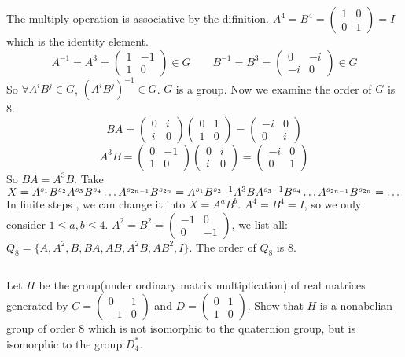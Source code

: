 \begin{answer}
    The multiply operation is associative by the difinition. $A^{4}=B^{4}=\begin{pmatrix}
        1&0\\0&1
    \end{pmatrix}=I$ which is the identity element.\[A^{-1}=A^{3}=\begin{pmatrix}
        1&-1\\1&0
    \end{pmatrix}\in G\qquad B^{-1}=B^{3}=\begin{pmatrix}
        0&-i\\-i&0
    \end{pmatrix}\in G\] So $\forall A^{i}B^{j}\in G$, $(A^{i}B^{j})^{-1}\in G$. $G$ is a group. Now we examine the order of $G$ is 8.\[BA=\begin{pmatrix}
        0&i\\i&0
    \end{pmatrix}\begin{pmatrix}
        0&1\\1&0
    \end{pmatrix}=\begin{pmatrix}
        -i&0\\0&i
    \end{pmatrix}\]\[A^3B=\begin{pmatrix}
        0&-1\\1&0
    \end{pmatrix}\begin{pmatrix}
        0&i\\i&0
    \end{pmatrix}=\begin{pmatrix}
        -i&0\\0&1
    \end{pmatrix}\]So $BA=A^3B$. Take $X=A^{s_1}B^{s_2}A^{s_3}B^{s_4}\dots A^{s_{2n-1}}B^{s_{2n}}=A^{s_1}B^{s_2-1}A^3B\\A^{s_3-1}B^{s_4}\dots A^{s_{2n-1}}B^{s_{2n}}=\dots$ In finite steps , we can change it into $X=A^aB^b$. $A^{4}=B^{4}=I$, so we only consider $1\leq a,b\leq 4$. $A^{2}=B^{2}=\begin{pmatrix}
        -1&0\\0&-1
    \end{pmatrix}$, we list all: $Q_8=\{A, A^{2}, B, BA, AB, A^{2}B, AB^{2}, I\}$. The order of $Q_8$ is 8.
\end{answer}

$$ $$

\begin{ex}
    Let $H$ be the group(under ordinary matrix multiplication) of real matrices generated by $C = \begin{pmatrix}
        0 & 1\\
        -1 & 0
    \end{pmatrix}$ and $D = \begin{pmatrix}
        0 & 1\\
        1 & 0
    \end{pmatrix}$. Show that $H$ is a nonabelian group of order 8 which is not isomorphic to the quaternion group, but is isomorphic to the group $D_4^*$.
\end{ex}

